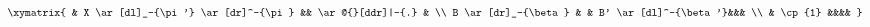 \begin{equation}
\xymatrix{
& X \ar[dl]_-{\pi'} \ar[dr]^-{\pi} && \ar@{}[ddr]|-{.} & \\
B \ar[dr]_-{\beta} & & B' \ar[dl]^-{\beta'}&&& \\
& \cp{1} &&&&
}
\end{equation}

